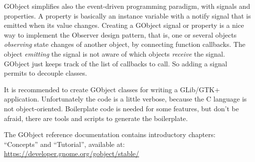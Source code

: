 GObject simplifies also the event-driven programming paradigm, with signals and properties. A property is basically an instance variable with a notify signal that is emitted when its value changes. Creating a GObject signal or property is a nice way to implement the Observer design pattern, that is, one or several objects \emph{observing} state changes of another object, by connecting function callbacks. The object \emph{emitting} the signal is not aware of which objects \emph{receive} the signal. GObject just keeps track of the list of callbacks to call. So adding a signal permits to decouple classes.

It is recommended to create GObject classes for writing a GLib/GTK+ application. Unfortunately the code is a little verbose, because the C language is not object-oriented. Boilerplate code is needed for some features, but don't be afraid, there are tools and scripts to generate the boilerplate.

The GObject reference documentation contains introductory chapters: ``Concepts'' and ``Tutorial'', available at:\\
\url{https://developer.gnome.org/gobject/stable/}
